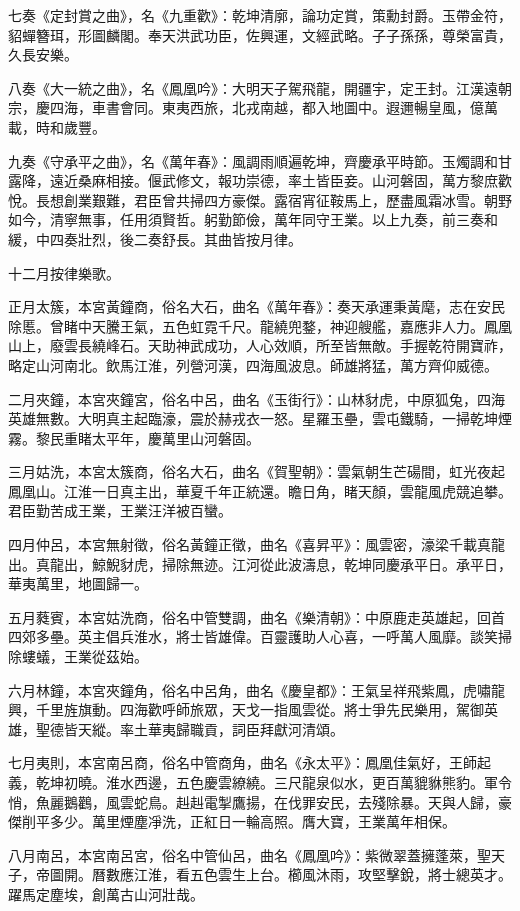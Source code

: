 七奏《定封賞之曲》，名《九重歡》：乾坤清廓，論功定賞，策勳封爵。玉帶金符，貂蟬簪珥，形圖麟閣。奉天洪武功臣，佐興運，文經武略。子子孫孫，尊榮富貴，久長安樂。

八奏《大一統之曲》，名《鳳凰吟》：大明天子駕飛龍，開疆宇，定王封。江漢遠朝宗，慶四海，車書會同。東夷西旅，北戎南越，都入地圖中。遐邇暢皇風，億萬載，時和歲豐。

九奏《守承平之曲》，名《萬年春》：風調雨順遍乾坤，齊慶承平時節。玉燭調和甘露降，遠近桑麻相接。偃武修文，報功崇德，率土皆臣妾。山河磐固，萬方黎庶歡悅。長想創業艱難，君臣曾共掃四方豪傑。露宿宵征鞍馬上，歷盡風霜冰雪。朝野如今，清寧無事，任用須賢哲。躬勤節儉，萬年同守王業。以上九奏，前三奏和緩，中四奏壯烈，後二奏舒長。其曲皆按月律。

十二月按律樂歌。

正月太簇，本宮黃鐘商，俗名大石，曲名《萬年春》：奏天承運秉黃麾，志在安民除慝。曾睹中天騰王氣，五色虹霓千尺。龍繞兜鍪，神迎艘艦，嘉應非人力。鳳凰山上，廢雲長繞峰石。天助神武成功，人心效順，所至皆無敵。手握乾符開寶祚，略定山河南北。飲馬江淮，列營河漢，四海風波息。師雄將猛，萬方齊仰威德。

二月夾鐘，本宮夾鐘宮，俗名中呂，曲名《玉街行》：山林豺虎，中原狐兔，四海英雄無數。大明真主起臨濠，震於赫戎衣一怒。星羅玉壘，雲屯鐵騎，一掃乾坤煙霧。黎民重睹太平年，慶萬里山河磐固。

三月姑洗，本宮太簇商，俗名大石，曲名《賀聖朝》：雲氣朝生芒碭間，虹光夜起鳳凰山。江淮一日真主出，華夏千年正統還。瞻日角，睹天顏，雲龍風虎競追攀。君臣勤苦成王業，王業汪洋被百蠻。

四月仲呂，本宮無射徵，俗名黃鐘正徵，曲名《喜昇平》：風雲密，濠梁千載真龍出。真龍出，鯨鯢豺虎，掃除無迹。江河從此波濤息，乾坤同慶承平日。承平日，華夷萬里，地圖歸一。

五月蕤賓，本宮姑洗商，俗名中管雙調，曲名《樂清朝》：中原鹿走英雄起，回首四郊多壘。英主倡兵淮水，將士皆雄偉。百靈護助人心喜，一呼萬人風靡。談笑掃除螻蟻，王業從茲始。

六月林鐘，本宮夾鐘角，俗名中呂角，曲名《慶皇都》：王氣呈祥飛紫鳳，虎嘯龍興，千里旌旗動。四海歡呼師旅眾，天戈一指風雲從。將士爭先民樂用，駕御英雄，聖德皆天縱。率土華夷歸職貢，詞臣拜獻河清頌。

七月夷則，本宮南呂商，俗名中管商角，曲名《永太平》：鳳凰佳氣好，王師起義，乾坤初曉。淮水西邊，五色慶雲繚繞。三尺龍泉似水，更百萬貔貅熊豹。軍令悄，魚麗鵝鸛，風雲蛇鳥。赳赳電掣鷹揚，在伐罪安民，去殘除暴。天與人歸，豪傑削平多少。萬里煙塵凈洗，正紅日一輪高照。膺大寶，王業萬年相保。

八月南呂，本宮南呂宮，俗名中管仙呂，曲名《鳳凰吟》：紫微翠蓋擁蓬萊，聖天子，帝圖開。曆數應江淮，看五色雲生上台。櫛風沐雨，攻堅擊銳，將士總英才。躍馬定塵埃，創萬古山河壯哉。

